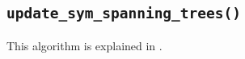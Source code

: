 \documentclass[a4paper,11pt]{article}
\begin{document}



\newpage
\subsection{\texttt{update\_sym\_spanning\_trees()}}

This algorithm is explained in \cite{blanco2013srba}.






\newpage


\end{document}
